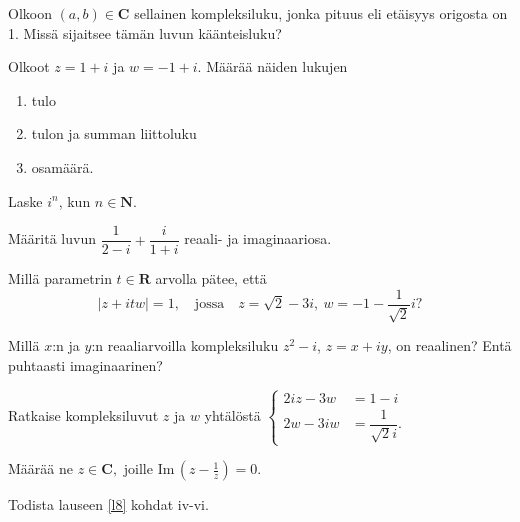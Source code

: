 \documentclass[a4paper, 12pt]{article}
\theoremstyle{remark}
\theoremstyle{definition}
\renewcommand{\Im}[1]{\textrm{Im}\, #1}
\begin{document}
\begin{teht}
Olkoon $(a, b)\in\mathbf{C}$ sellainen kompleksiluku, jonka pituus eli etäisyys origosta on 1. Missä sijaitsee tämän luvun käänteisluku?
\end{teht}


\begin{teht}
Olkoot $z=1+i$ ja $w=-1+i$. Määrää näiden lukujen
\begin{enumerate}[leftmargin=*, label=\roman*), topsep=0pt, itemsep=12pt, parsep=0pt, font=\small\bfseries\color{blue}] 
\item tulo
\item tulon ja summan liittoluku
\item osamäärä.
\end{enumerate}
\end{teht}

\begin{teht}
Laske $i^n$, kun $n\in\mathbf{N}.$
\end{teht}

\begin{teht}
Määritä luvun $\dfrac{1}{2-i}+\dfrac{i}{1+i}$ reaali- ja imaginaariosa.
\end{teht}

\begin{teht}
Millä parametrin $t\in\mathbf{R}$ arvolla pätee, että 
$$
\left|z+itw\right|=1,\quad\text{jossa}\quad z=\sqrt{2}-3i,\ w=-1-\frac{1}{\sqrt{2}}i\text{?}
$$
\end{teht}

\begin{teht}
Millä $x$:n ja $y$:n reaaliarvoilla kompleksiluku $z^2-i$, $z=x+iy$, on reaalinen? Entä puhtaasti imaginaarinen?
\end{teht}

\begin{teht}
Ratkaise kompleksiluvut $z$ ja $w$ yhtälöstä $\displaystyle
\begin{cases}
2iz-3w&=1-i\\
2w-3iw&=\dfrac{1}{\sqrt{2}i}.
\end{cases}$
\end{teht}

\begin{teht}
Määrää ne $z\in\mathbf{C},$ joille $\Im\left(z-\frac{1}{z}\right)=0.$
\end{teht}

\begin{teht} Todista lauseen \ref{l8} kohdat iv-vi.

\end{teht}
\end{document}
